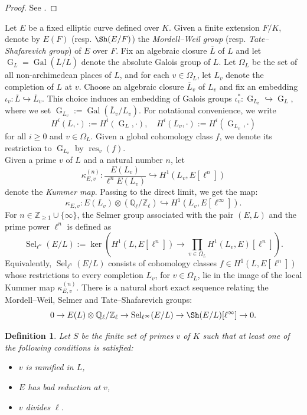 \documentclass[11pt,reqno]{amsart}
\newtheorem{definition}[theorem]{Definition}
\newcommand{\Z}{\mathbb{Z}}
\newcommand{\Q}{\mathbb{Q}}
\numberwithin{equation}{section}
\begin{document}
\begin{proof}
See \cite[Proposition 1.6.12]{NSW}.
\end{proof}Let $E$ be a fixed elliptic curve defined over $K$. Given a finite extension $F/K$, denote by $E(F)$ (resp. $\Sh(E/F)$) the \emph{Mordell--Weil group} (resp. \emph{Tate--Shafarevich group}) of $E$ over $F$. Fix an algebraic closure \(\overline{L}\) of \(L\) and let \(\operatorname{G}_L = \operatorname{Gal}(\overline{L}/L)\) denote the absolute Galois group of \(L\). Let \(\Omega_L\) be the set of all non-archimedean places of \(L\), and for each \( v \in \Omega_L \), let \(L_v\) denote the completion of \(L\) at \(v\). Choose an algebraic closure \(\overline{L}_v\) of \(L_v\) and fix an embedding \(\iota_v: \overline{L} \hookrightarrow \overline{L}_v\). This choice induces an embedding of Galois groups \(\iota_v^*: \operatorname{G}_{L_v} \hookrightarrow \operatorname{G}_L\), where we set \(\operatorname{G}_{L_v} := \operatorname{Gal}(\overline{L}_v / L_v)\). For notational convenience, we write  
\[
H^i(L, \cdot) := H^i(\operatorname{G}_L, \cdot), \quad H^i(L_v, \cdot) := H^i(\operatorname{G}_{L_v}, \cdot)
\]  
for all \( i \geq 0 \) and \( v \in \Omega_L \). Given a global cohomology class \( f \), we denote its restriction to \(\operatorname{G}_{L_v}\) by \(\operatorname{res}_v(f)\).\\

Given a prime $v$ of $L$ and a natural number $n$, let \[\kappa_{E,v}^{(n)}:\frac{E(L_v)}{\ell^n E(L_v)}\hookrightarrow H^1(L_v, E[\ell^n])\] denote the \emph{Kummer map}. Passing to the direct limit, we get the map:
\[\kappa_{E,v}:E(L_v)\otimes \left(\Q_\ell/\Z_\ell\right)\hookrightarrow H^1(L_v, E[\ell^\infty]).\]
For $n\in \Z_{\geq 1}\cup \{\infty\}$, the Selmer group associated with the pair \((E, L)\) and the prime power \( \ell^n \) is defined as  
\[
\operatorname{Sel}_{\ell^n}(E/L) := \ker \left( H^1(L, E[\ell^n]) \to \prod_{v \in \Omega_L} H^1(L_v, E)[\ell^n] \right).
\]  
Equivalently, \(\operatorname{Sel}_{\ell^n}(E/L)\) consists of cohomology classes \( f \in H^1(L, E[\ell^n]) \) whose restrictions to every completion \( L_v \), for \( v \in \Omega_L \), lie in the image of the local Kummer map \( \kappa_{E,v}^{(n)} \). There is a natural short exact sequence relating the Mordell--Weil, Selmer and Tate--Shafarevich groups:
\[
0 \to E(L) \otimes \mathbb{Q}_\ell/\mathbb{Z}_\ell \to \operatorname{Sel}_{\ell^\infty}(E/L) \to \Sh(E/L)[\ell^\infty] \to 0.
\]

\begin{definition}\label{choice of S} Let $S$ be the finite set of primes $v$ of $K$ such that at least one of the following conditions is satisfied:
 \begin{itemize}
        \item $v$ is ramified in $L$, 
        \item $E$ has bad reduction at $v$, 
        \item $v$ divides $\ell$.
    \end{itemize}
\end{definition}  
\end{document}
